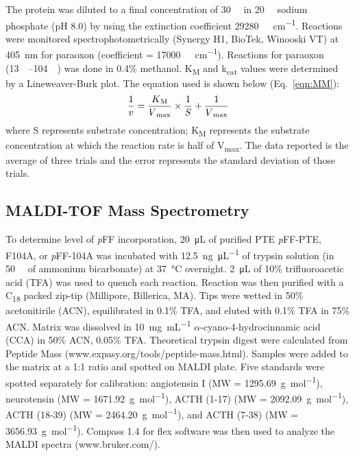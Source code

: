 \begin{refsection}
The protein was diluted to a final concentration of \SI{30}{\nano\Molar} in
\SI{20}{\milli\Molar} sodium phosphate (pH 8.0) by using the extinction
coefficient \SI{29280}{\per\Molar\per\cm}. Reactions were monitored
spectrophotometrically (Synergy H1, BioTek, Winooski VT) at \SI{405}{\nm} for
paraoxon (coefficient = \SI{17000}{\per\Molar\per\cm}).  Reactions for paraoxon
(\SIrange{13}{104}{\micro\Molar}) was done in 0.4\% methanol.
K\textsubscript{M} and k\textsubscript{cat} values were determined by a
Lineweaver-Burk plot.\cite{Baker2011b} The equation used is shown below
(Eq.~\ref{eqn:MM}): 
\begin{equation} 
    \frac{1}{v} =
    \frac{K\textsubscript{M}}{V\textsubscript{max}}\times\frac{1}{S} +
    \frac{1}{V\textsubscript{max}} 
    \label{eqn:MM}
\end{equation}
where S represents substrate concentration; K\textsubscript{M} represents the
substrate concentration at which the reaction rate is half of
V\textsubscript{max}. The data reported is the average of three trials and the
error represents the standard deviation of those trials.

\subsection{MALDI-TOF Mass Spectrometry}

To determine level of \emph{p}FF incorporation, \SI{20}{\micro\liter} of
purified PTE \emph{p}FF-PTE, F104A, or \emph{p}FF-104A was incubated with
\SI{12.5}{\ng\per\uL} of trypsin solution (in \SI{50}{\milli\Molar} of ammonium
bicarbonate) at \SI{37}{\celsius} overnight. \SI{2}{\uL} of 10\%
trifluoroacetic acid (TFA) was used to quench each reaction. Reaction was then
purified with a C\textsubscript{18} packed zip-tip (Millipore, Billerica, MA).
Tips were wetted in 50\% acetonitirile (ACN), equilibrated in 0.1\% TFA, and
eluted with 0.1\% TFA in 75\% ACN. Matrix was dissolved in \SI{10}{\mg\per\mL}
$\alpha$-cyano-4-hydrocinnamic acid (CCA) in 50\% ACN, 0.05\% TFA. Theoretical
trypsin digest were calculated from Peptide Mass
(www.expasy.org/tools/peptide-mass.html). Samples were added to the matrix at a
1:1 ratio and spotted on MALDI plate. Five standards were spotted separately
for calibration: angiotensin I (MW = \SI{1295.69}{\g\per\mole}), neurotensin
(MW = \SI{1671.92}{\g\per\mole}), ACTH (1-17) (MW = \SI{2092.09}{\g\per\mole}),
ACTH (18-39) (MW = \SI{2464.20}{\g\per\mole}), and ACTH (7-38) (MW =
\SI{3656.93}{\g\per\mole}).  Compass 1.4 for flex software was then used to
analyze the MALDI spectra (www.bruker.com/).


\end{refsection}
